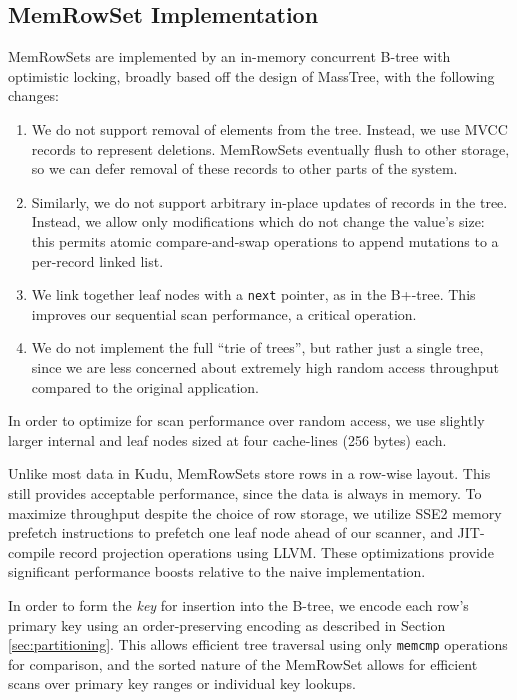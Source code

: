 \documentclass{vldb}
\begin{document}
\subsection{MemRowSet Implementation}

MemRowSets are implemented by an in-memory concurrent B-tree with optimistic
locking, broadly based off the design of MassTree\cite{masstree}, with the following
changes:
\begin{enumerate}
\item We do not support removal of elements from the tree. Instead, we use MVCC
  records to represent deletions. MemRowSets eventually flush to other storage,
  so we can defer removal of these records to other parts of the system.
\item Similarly, we do not support arbitrary in-place updates of records in the tree.
  Instead, we allow only modifications which do not change the value's size:
  this permits atomic compare-and-swap operations to append mutations to a
  per-record linked list.
\item We link together leaf nodes with a {\tt next} pointer, as in the B+-tree\cite{bplus_tree}.
  This improves our sequential scan performance, a critical operation.
\item We do not implement the full ``trie of trees'', but rather just a single
  tree, since we are less concerned about extremely high random access throughput
  compared to the original application.
\end{enumerate}

In order to optimize for scan performance over random access, we use slightly larger internal and
leaf nodes sized at four cache-lines (256 bytes) each.

Unlike most data in Kudu, MemRowSets store rows in a row-wise layout. This still
provides acceptable performance, since the data is always in memory. To maximize
throughput despite the choice of row storage, we utilize
SSE2 memory prefetch instructions to prefetch one leaf node ahead of our scanner,
and JIT-compile record projection operations using LLVM\cite{llvm}.
These optimizations provide significant performance boosts relative to the
naive implementation.

In order to form the {\em key} for insertion into the B-tree, we encode
each row's primary key using an order-preserving encoding as described in
Section \ref{sec:partitioning}. This allows efficient tree traversal using
only {\tt memcmp} operations for comparison, and the sorted nature of the
MemRowSet allows for efficient scans over primary key ranges or individual
key lookups.
\end{document}
